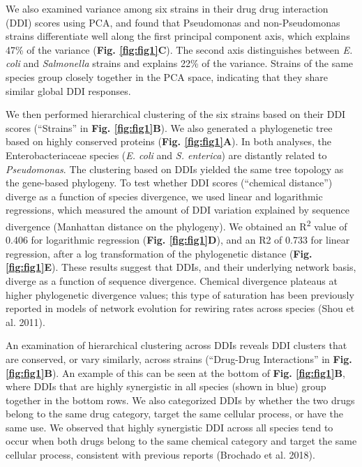 \documentclass[
]{article}
\begin{document}
We also examined variance among six strains in their drug drug interaction (DDI) scores using PCA, and found that Pseudomonas and non-Pseudomonas strains differentiate well along the first principal component axis, which explains 47\% of the variance (\textbf{Fig. \ref{fig:fig1}C}). The second axis distinguishes between \emph{E. coli} and \emph{Salmonella} strains and explains 22\% of the variance. Strains of the same species group closely together in the PCA space, indicating that they share similar global DDI responses.

We then performed hierarchical clustering of the six strains based on their DDI scores (``Strains'' in \textbf{Fig. \ref{fig:fig1}B}). We also generated a phylogenetic tree based on highly conserved proteins (\textbf{Fig. \ref{fig:fig1}A}). In both analyses, the Enterobacteriaceae species (\emph{E. coli} and \emph{S. enterica}) are distantly related to \emph{Pseudomonas}. The clustering based on DDIs yielded the same tree topology as the gene-based phylogeny. To test whether DDI scores (``chemical distance'') diverge as a function of species divergence, we used linear and logarithmic regressions, which measured the amount of DDI variation explained by sequence divergence (Manhattan distance on the phylogeny). We obtained an R\textsuperscript{2} value of 0.406 for logarithmic regression (\textbf{Fig. \ref{fig:fig1}D}), and an R2 of 0.733 for linear regression, after a log transformation of the phylogenetic distance (\textbf{Fig. \ref{fig:fig1}E}). These results suggest that DDIs, and their underlying network basis, diverge as a function of sequence divergence. Chemical divergence plateaus at higher phylogenetic divergence values; this type of saturation has been previously reported in models of network evolution for rewiring rates across species (Shou et al. 2011).

An examination of hierarchical clustering across DDIs reveals DDI clusters that are conserved, or vary similarly, across strains (``Drug-Drug Interactions'' in \textbf{Fig. \ref{fig:fig1}B}). An example of this can be seen at the bottom of \textbf{Fig. \ref{fig:fig1}B}, where DDIs that are highly synergistic in all species (shown in blue) group together in the bottom rows. We also categorized DDIs by whether the two drugs belong to the same drug category, target the same cellular process, or have the same use. We observed that highly synergistic DDI across all species tend to occur when both drugs belong to the same chemical category and target the same cellular process, consistent with previous reports (Brochado et al. 2018).
\end{document}
